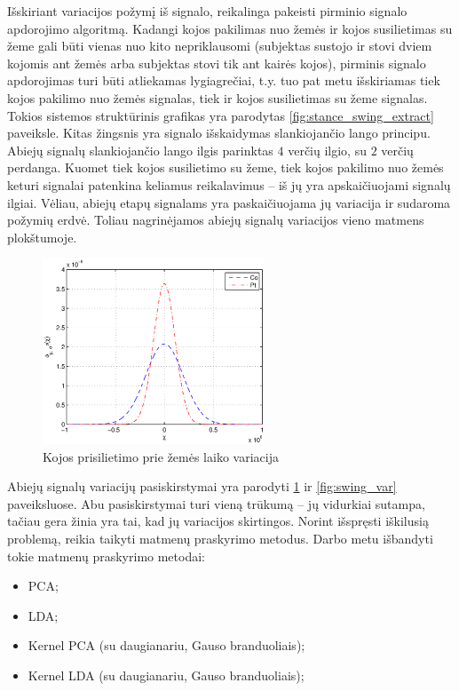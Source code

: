\documentclass[]{vgtuef}
\begin{document}
Išskiriant variacijos požymį iš signalo, reikalinga pakeisti pirminio signalo apdorojimo algoritmą. Kadangi kojos pakilimas nuo žemės ir kojos susilietimas su žeme gali būti vienas nuo kito nepriklausomi (subjektas sustojo ir stovi dviem kojomis ant žemės arba subjektas stovi tik ant kairės kojos), pirminis signalo apdorojimas turi būti atliekamas lygiagrečiai, t.y. tuo pat metu išskiriamas tiek kojos pakilimo nuo žemės signalas, tiek ir kojos susilietimas su žeme signalas. Tokios sistemos struktūrinis grafikas yra parodytas \ref{fig:stance_swing_extract} paveiksle. Kitas žingsnis yra signalo išskaidymas slankiojančio lango principu. Abiejų signalų slankiojančio lango ilgis parinktas $4$ verčių ilgio, su $2$ verčių perdanga. Kuomet tiek kojos susilietimo su žeme, tiek kojos pakilimo nuo žemės keturi signalai patenkina keliamus reikalavimus -- iš jų yra apskaičiuojami signalų ilgiai. Vėliau, abiejų etapų signalams yra paskaičiuojama jų variacija ir sudaroma požymių erdvė. Toliau nagrinėjamos abiejų signalų variacijos vieno matmens plokštumoje.

\begin{figure}[!t]
  \centering
  \includegraphics[width=250px]{figures/stance_phase.eps}
  \caption{Kojos prisilietimo prie žemės laiko variacija}
  \label{fig:stance_var}
\end{figure}

Abiejų signalų variacijų pasiskirstymai yra parodyti \ref{fig:stance_var} ir \ref{fig:swing_var} paveiksluose. Abu pasiskirstymai turi vieną trūkumą -- jų vidurkiai sutampa, tačiau gera žinia yra tai, kad jų variacijos skirtingos. Norint išspręsti iškilusią problemą, reikia taikyti matmenų praskyrimo metodus. Darbo metu išbandyti tokie matmenų praskyrimo metodai:

\begin{itemize}
\item PCA;
\item LDA;
\item Kernel PCA (su daugianariu, Gauso branduoliais);
\item Kernel LDA (su daugianariu, Gauso branduoliais);
\end{itemize}
\end{document}
